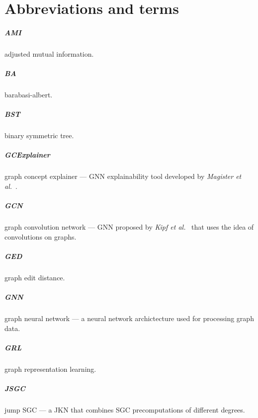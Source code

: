 \chapter{Abbreviations and terms}

\paragraph{AMI}
adjusted mutual information.

\paragraph{BA}
barabasi-albert.

\paragraph{BST}
binary symmetric tree.

\paragraph{GCExplainer}
graph concept explainer --- GNN explainability tool developed by \textit{Magister et al.}~\cite{magister2021gcexplainer}.

\paragraph{GCN}
graph convolution network --- GNN proposed by \textit{Kipf et al.}~\cite{kipf2016semi} that uses the idea of convolutions on graphs.

\paragraph{GED}
graph edit distance.

\paragraph{GNN}
graph neural network --- a neural network archictecture used for processing graph data.

\paragraph{GRL}
graph representation learning.

\paragraph{JSGC}
jump SGC --- a JKN that combines SGC precomputations of different degrees.

